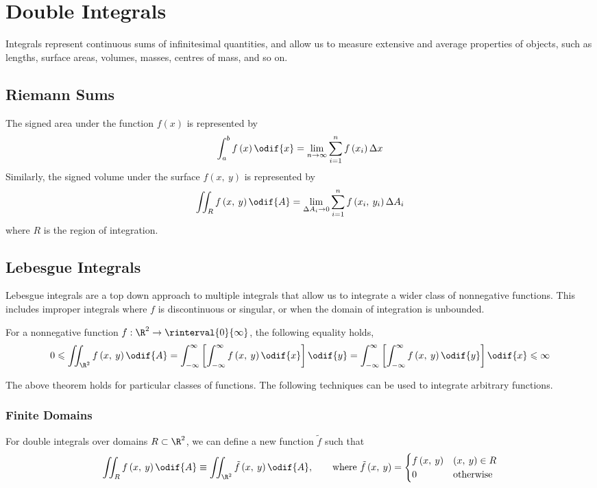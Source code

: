 \documentclass{article}
\begin{document}
\section{Double Integrals}
Integrals represent continuous sums of infinitesimal quantities, and
allow us to measure extensive and average properties of objects, such
as lengths, surface areas, volumes, masses, centres of mass, and so on.
\subsection{Riemann Sums}
The signed area under the function \(f\left( x \right)\) is represented
by
\begin{equation*}
    \int_a^b f\left( x \right) \odif{x} = \lim_{n \to \infty} \sum_{i = 1}^n f\left( x_i \right) \Delta x
\end{equation*}
Similarly, the signed volume under the surface \(f\left( x,\: y \right)\)
is represented by
\begin{equation*}
    \iint_R f\left( x,\: y \right) \odif{A} = \lim_{\Delta A_i \to 0} \sum_{i = 1}^n f\left( x_i,\: y_i \right) \Delta A_i
\end{equation*}
where \(R\) is the region of integration.
\subsection{Lebesgue Integrals}
Lebesgue integrals are a top down approach to multiple integrals that
allow us to integrate a wider class of nonnegative functions. This
includes improper integrals where \(f\) is discontinuous or singular,
or when the domain of integration is unbounded.
\begin{theorem}
    For a nonnegative function \(f : \R^2 \to \rinterval{0}{\infty}\),
    the following equality holds,
    \begin{equation*}
        0 \leqslant \iint_{\R^2} f\left( x,\: y \right) \odif{A} = \int_{-\infty}^\infty \left[ \int_{-\infty}^\infty f\left( x,\: y \right) \odif{x} \right] \odif{y} = \int_{-\infty}^\infty \left[ \int_{-\infty}^\infty f\left( x,\: y \right) \odif{y} \right] \odif{x} \leqslant \infty
    \end{equation*}
\end{theorem}
The above theorem holds for particular classes of functions. The
following techniques can be used to integrate arbitrary functions.
\subsubsection{Finite Domains}
For double integrals over domains \(R \subset \R^2\), we can define a
new function \(\tilde{f}\) such that
\begin{equation*}
    \iint_R f\left( x,\: y \right) \odif{A} \equiv \iint_{\R^2} \tilde{f}\left( x,\: y \right) \odif{A}, \qquad \text{where } \tilde{f}\left( x,\: y \right) =
    \begin{cases}
        f\left( x,\: y \right) & \left( x,\: y \right) \in R \\
        0                      & \text{otherwise}
    \end{cases}
\end{equation*}
\end{document}
